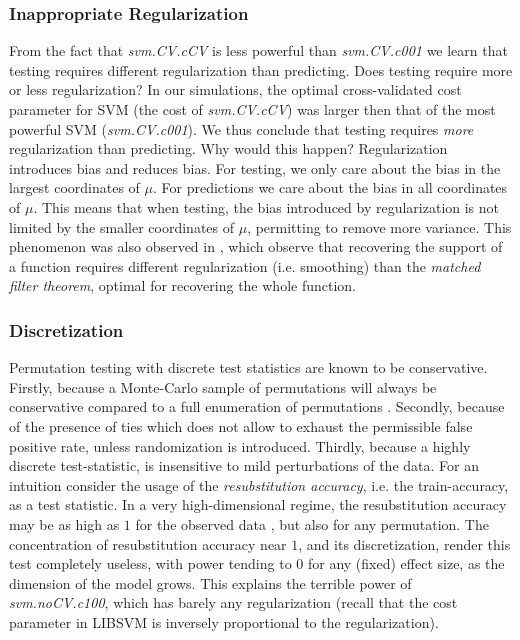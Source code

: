 \documentclass[]{bio}
\begin{document}
\subsubsection{Inappropriate Regularization}
From the fact that \emph{svm.CV.cCV} is less powerful than \emph{svm.CV.c001} we learn that testing requires different regularization than predicting.
Does testing require more or less regularization?
In our simulations, the optimal cross-validated cost parameter for SVM (the cost of \emph{svm.CV.cCV}) was larger then that of the most powerful SVM (\emph{svm.CV.c001}).
We thus conclude that testing requires \emph{more} regularization  than predicting. 
Why would this happen?
Regularization introduces bias and reduces bias. 
For testing, we only care about the bias in the largest coordinates of $\mu$. 
For predictions we care about the bias in all coordinates of $\mu$. 
This means that when testing, the bias introduced by regularization is not limited by the smaller coordinates of $\mu$, permitting to remove more variance. 
This phenomenon was also observed in \cite{cheng2017multiple}, which observe that recovering the support of a function requires different regularization (i.e. smoothing) than the \emph{matched filter theorem}, optimal for recovering the whole function.


\subsubsection{Discretization}
Permutation testing with discrete test statistics are known to be conservative.
Firstly, because a Monte-Carlo sample of permutations will always be conservative compared to a full enumeration of permutations \citep{hemerik_exact_2014}.
Secondly, because of the presence of ties which does not allow to exhaust the permissible false positive rate, unless randomization is introduced.
Thirdly, because a highly discrete test-statistic, is insensitive to mild perturbations of the data.
For an intuition consider the usage of the \emph{resubstitution accuracy}, i.e. the train-accuracy, as a test statistic. 
In a very high-dimensional regime, the resubstitution accuracy may be as high as $1$ for the observed data \cite[Theorem 1]{mclachlan_bias_1976}, but also for any permutation.
The concentration of resubstitution accuracy near $1$, and its discretization, render this test completely useless, with power tending to $0$ for any (fixed) effect size, as the dimension of the model grows. 
This explains the terrible power of \emph{svm.noCV.c100}, which has barely any regularization (recall that the cost parameter in LIBSVM is inversely proportional to the regularization). 
\end{document}

